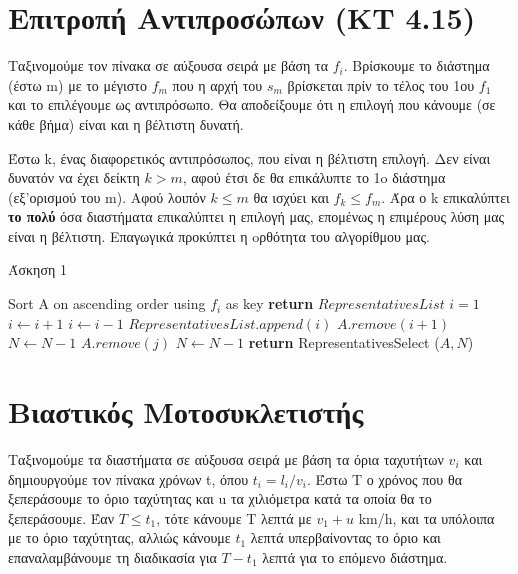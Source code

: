 \documentclass[a4paper,11pt]{article}
\begin{document}
\renewcommand{\labelenumi}{\roman{enumi})}
\renewcommand{\labelenumii}{(\arabic{enumii})}



\section{Επιτροπή Αντιπροσώπων (KT 4.15)} \setcounter{section}{1}
Ταξινομούμε τον πίνακα σε αύξουσα σειρά με βάση τα $f_i$. Βρίσκουμε το διάστημα (έστω m) με το
μέγιστο $f_m$ που η αρχή του $s_m$ βρίσκεται πρίν το τέλος του 1ου $f_1$ και
το επιλέγουμε ως αντιπρόσωπο.
Θα αποδείξουμε ότι η επιλογή που κάνουμε (σε κάθε βήμα) είναι και η βέλτιστη
δυνατή.

Έστω k, ένας διαφορετικός αντιπρόσωπος, που είναι η βέλτιστη επιλογή. Δεν
είναι δυνατόν να έχει δείκτη $k > m$, αφού έτσι δε θα επικάλυπτε το 1o διάστημα
(εξ'ορισμού του m). Αφού λοιπόν $k \leq m$ θα ισχύει και $f_k \leq f_m$. Άρα ο
k επικαλύπτει \textbf{το πολύ} όσα διαστήματα επικαλύπτει η επιλογή μας,
επομένως η επιμέρους λύση μας είναι η βέλτιστη.
Eπαγωγικά προκύπτει η oρθότητα του αλγορίθμου μας.

\begin{algorithm}[H]
\caption{Άσκηση 1}
\begin{algorithmic}[1]
    \State Sort A on ascending order using $f_i$ as key
    \State \textbf{return} $RepresentativesList$
    \Else
    \State $i = 1$
        \State $i \gets i+1$
    \EndWhile
    \State $i \gets i-1$
    \State $RepresentativesList.append (i)$
	\State $A.remove(i+1)$
	\State $N \gets N-1$
    \EndIf
	\State $A.remove (j)$
	\State $N \gets N-1$
    \EndFor
    \State \textbf{return} RepresentativesSelect ($A, N$)
    \EndIf
\EndProcedure
\end{algorithmic}
\end{algorithm}



\section{Βιαστικός Μοτοσυκλετιστής}
Ταξινομούμε τα διαστήματα σε αύξουσα σειρά με βάση τα όρια ταχυτήτων $v_i$ και
δημιουργούμε τον πίνακα χρόνων t, όπου $t_i = l_i/v_i$.
Έστω Τ ο χρόνος που θα ξεπεράσουμε το όριο ταχύτητας και u τα χιλιόμετρα κατά
τα οποία θα το ξεπεράσουμε. Έαν $T \leq t_1$, τότε κάνουμε Τ λεπτά με $v_1 +
u$ km/h, και τα υπόλοιπα με το όριο ταχύτητας, αλλιώς κάνουμε $t_1$ λεπτά
υπερβαίνοντας το όριο και επαναλαμβάνουμε τη διαδικασία για $T - t_1$ λεπτά
για το επόμενο διάστημα.
\end{document}
